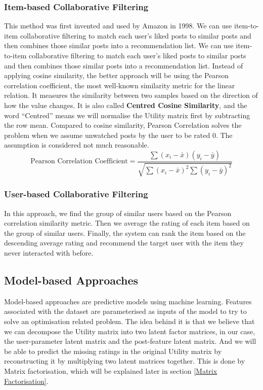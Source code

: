\subsubsection{Item-based Collaborative Filtering}
This method was first invented and used by Amazon in 1998. We can use item-to-item collaborative filtering to match each user’s liked posts to similar posts and then combines those similar posts into a recommendation list.
We can use item-to-item collaborative filtering to match each user’s liked posts to similar posts and then combines those similar posts into a recommendation list.
Instead of applying cosine similarity, the better approach will be using the Pearson correlation coefficient, the most well-known similarity metric for the linear relation. It measures the similarity between two samples based on the direction of how the value changes. It is also called \textbf{Centred Cosine Similarity}, and the word “Centred” means we will normalise the Utility matrix first by subtracting the row mean. Compared to cosine similarity, Pearson Correlation solves the problem when we assume unwatched posts by the user to be rated 0. The assumption is considered not much reasonable.
\begin{equation*}
\text{Pearson Correlation Coefficient} = \frac{\sum(x_{i} - \bar{x})(y_{i} - \bar{y})} {\sqrt{\sum(x_{i} - \bar{x})^{2} \sum{(y_{i} - \bar{y})^{2} }}}
\end{equation*}


\subsubsection{User-based Collaborative Filtering}
In this approach, we find the group of similar users based on the Pearson correlation similarity metric. Then we average the rating of each item based on the group of similar users. Finally, the system can rank the item based on the descending average rating and recommend the target user with the item they never interacted with before.

\subsection{Model-based Approaches}
Model-based approaches are predictive models using machine learning. Features associated with the dataset are parameterised as inputs of the model to try to solve an optimisation related problem. The idea behind it is that we believe that we can decompose the Utility matrix into two latent factor matrices, in our case, the user-parameter latent matrix and the post-feature latent matrix. And we will be able to predict the missing ratings in the original Utility matrix by reconstructing it by multiplying two latent matrices together. This is done by Matrix factorisation, which will be explained later in section \ref{Matrix Factorisation}.
